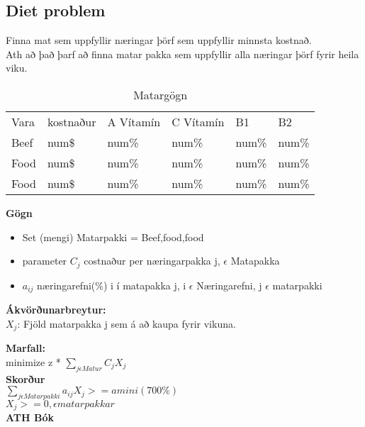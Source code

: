 \documentclass[]{article}
\begin{document}
\subsection*{Diet problem}
Finna mat sem uppfyllir næringar þörf sem uppfyllir minnsta kostnað.\\
Ath að það þarf að finna matar pakka sem uppfyllir alla næringar þörf fyrir heila viku.\\

\begin{table}[h]
	\centering
	\caption{Matargögn}
	\label{my-label}
	\begin{tabular}{llllll}
		Vara & kostnaður & A Vítamín & C Vítamín & B1    & B2    \\
		Beef & num\$     & num\%     & num\%     & num\% & num\% \\   
		Food & num\$     & num\%     & num\%     & num\% & num\% \\
		Food & num\$     & num\%     & num\%     & num\% & num\% \\
	\end{tabular}
\end{table}

\textbf{Gögn}

\begin{itemize}
	\item Set (mengi) Matarpakki = {Beef,food,food}
	\item parameter $C_{j}$ costnaður per næringarpakka j, $\epsilon$ Matapakka 
	\item $a_{ij}$ næringarefni(\%) i í matapakka j, i $\epsilon$ Næringarefni, j $\epsilon$ matarpakki
\end{itemize}

\textbf{Ákvörðunarbreytur:}\\
$X_{j}$: Fjöld matarpakka j sem á að kaupa fyrir vikuna.

\textbf{Marfall:} \\
minimize z * $\sum\limits_{j \epsilon Matur}^{} C_{j}X_{j}$\\

\textbf{Skorður} \\
$\sum\limits_{j \epsilon Matarpakki}^{} a_{ij}X_{j} >= amini (700\%)$\\
$X_{j} >= 0, \epsilon matarpakkar$\\

\textbf{ATH Bók}\\
\end{document}
